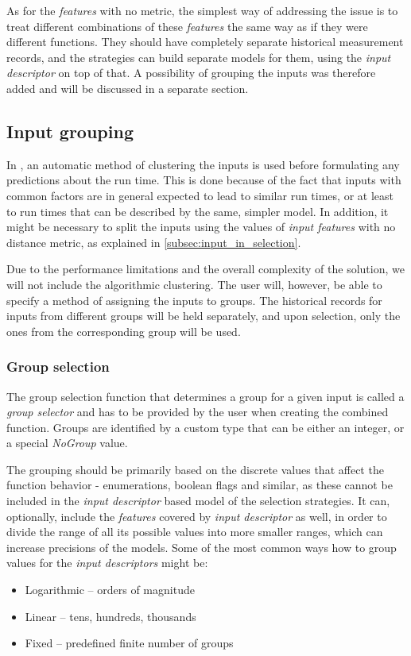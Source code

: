 As for the \textit{features} with no metric, the simplest way of addressing the issue is to treat different combinations of these \textit{features} the same way as if they were different functions. They should have completely separate historical measurement records, and the strategies can build separate models for them, using the \textit{input descriptor} on top of that. A possibility of grouping the inputs was therefore added and will be discussed in a separate section.

\subsection{Input grouping}
\label{subsec:grouping}

In \cite{smith_predicting_1998}, an automatic method of clustering the inputs is used before formulating any predictions about the run time. This is done because of the fact that inputs with common factors are in general expected to lead to similar run times, or at least to run times that can be described by the same, simpler model. In addition, it might be necessary to split the inputs using the values of \textit{input features} with no distance metric, as explained in \ref{subsec:input_in_selection}.

Due to the performance limitations and the overall complexity of the solution, we will not include the algorithmic clustering. The user will, however, be able to specify a method of assigning the inputs to groups. The historical records for inputs from different groups will be held separately, and upon selection, only the ones from the corresponding group will be used.

\subsubsection{Group selection}
\label{subsubsec:group_selection}

The group selection function that determines a group for a given input is called a \textit{group selector} and has to be provided by the user when creating the combined function. Groups are identified by a custom type that can be either an integer, or a special \textit{NoGroup} value. 

The grouping should be primarily based on the discrete values that affect the function behavior - enumerations, boolean flags and similar, as these cannot be included in the \textit{input descriptor} based model of the selection strategies. It can, optionally, include the \textit{features} covered by \textit{input descriptor} as well, in order to divide the range of all its possible values into more smaller ranges, which can increase precisions of the models. Some of the most common ways how to group values for the \textit{input descriptors} might be:
\begin{itemize}
	\item Logarithmic -- orders of magnitude
	\item Linear -- tens, hundreds, thousands
	\item Fixed -- predefined finite number of groups
\end{itemize}

